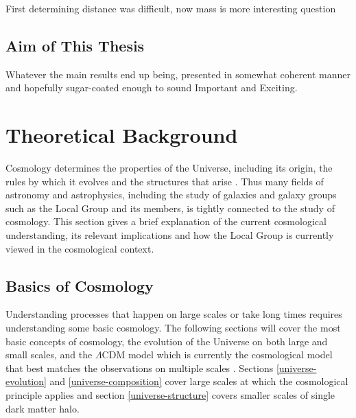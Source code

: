 \documentclass[english, oneside]{HYgradu}
\begin{document}
First determining distance was difficult, now mass is more interesting question

\section{Aim of This Thesis}
Whatever the main results end up being, presented in somewhat coherent manner and hopefully sugar-coated enough to sound Important and Exciting.


\chapter{Theoretical Background}

Cosmology determines the properties of the Universe, including its origin, the rules by which it evolves and the structures that arise \citep{mo2010galaxy}. Thus many fields of astronomy and astrophysics, including the study of galaxies and galaxy groups such as the Local Group and its members, is tightly connected to the study of cosmology. This section gives a brief explanation of the current cosmological understanding, its relevant implications and how the Local Group is currently viewed in the cosmological context.

\section{Basics of Cosmology}
Understanding processes that happen on large scales or take long times requires understanding some basic cosmology. The following sections will cover the most basic concepts of cosmology, the evolution of the Universe on both large and small scales, and the $\Lambda$CDM model which is currently the cosmological model that best matches the observations on multiple scales \citep{mo2010galaxy}. Sections \ref{universe-evolution} and \ref{universe-composition} cover large scales at which the cosmological principle applies and section \ref{universe-structure} covers smaller scales of single dark matter halo.
\end{document}
